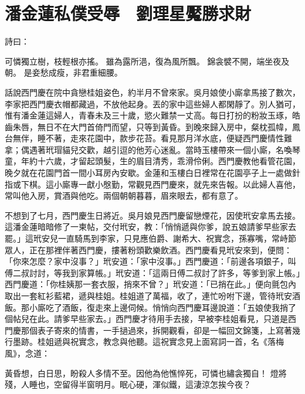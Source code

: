 %

\chapter{潘金蓮私僕受辱　劉理星魘勝求財}

詩曰：

可憐獨立樹，枝輕根亦搖。
雖為露所浥，復為風所飄。
錦衾襞不開，端坐夜及朝。
是妾愁成瘦，非君重細腰。

話說西門慶在院中貪戀桂姐姿色，約半月不曾來家。吳月娘使小廝拿馬接了數次，李家把西門慶衣帽都藏過，不放他起身。丟的家中這些婦人都閑靜了。別人猶可，惟有潘金蓮這婦人，青春未及三十歲，慾火難禁一丈高。每日打扮的粉妝玉琢，皓齒朱唇，無日不在大門首倚門而望，只等到黃昏。到晚來歸入房中，粲枕孤幃，鳳台無伴，睡不著，走來花園中，款步花苔。看見那月洋水底，便疑西門慶情性難拿；偶遇著玳瑁貓兒交歡，越引逗的他芳心迷亂。當時玉樓帶來一個小廝，名喚琴童，年約十六歲，才留起頭髮，生的眉目清秀，乖滑伶俐。西門慶教他看管花園，晚夕就在花園門首一間小耳房內安歇。金蓮和玉樓白日裡常在花園亭子上一處做針指或下棋。這小廝專一獻小慇勤，常觀見西門慶來，就先來告報。以此婦人喜他，常叫他入房，賞酒與他吃。兩個朝朝暮暮，眉來眼去，都有意了。

不想到了七月，西門慶生日將近。吳月娘見西門慶留戀煙花，因使玳安拿馬去接。這潘金蓮暗暗修了一柬帖，交付玳安，教：「悄悄遞與你爹，說五娘請爹早些家去罷。」這玳安兒一直騎馬到李家，只見應伯爵、謝希大、祝實念，孫寡嘴，常峙節眾人，正在那裡伴著西門慶，摟著粉頭歡樂飲酒。西門慶看見玳安來到，便問： 「你來怎麼？家中沒事？」玳安道：「家中沒事。」西門慶道：「前邊各項銀子，叫傅二叔討討，等我到家算帳。」玳安道：「這兩日傅二叔討了許多，等爹到家上帳。」西門慶道：「你桂姨那一套衣服，捎來不曾？」玳安道：「已捎在此。」便向氈包內取出一套紅衫藍裙，遞與桂姐。桂姐道了萬福，收了，連忙吩咐下邊，管待玳安酒飯。那小廝吃了酒飯，復走來上邊伺候。悄悄向西門慶耳邊說道：「五娘使我捎了個帖兒在此。請爹早些家去。」西門慶才待用手去接，早被李桂姐看見，只道是西門慶那個表子寄來的情書，一手撾過來，拆開觀看，卻是一幅回文錦箋，上寫著幾行墨跡。桂姐遞與祝實念，教念與他聽。這祝實念見上面寫詞一首，名《落梅風》，念道：

黃昏想，白日思，盼殺人多情不至。因他為他憔悴死，可憐也繡衾獨自！
燈將殘，人睡也，空留得半窗明月。眠心硬，渾似鐵，這淒涼怎挨今夜？

